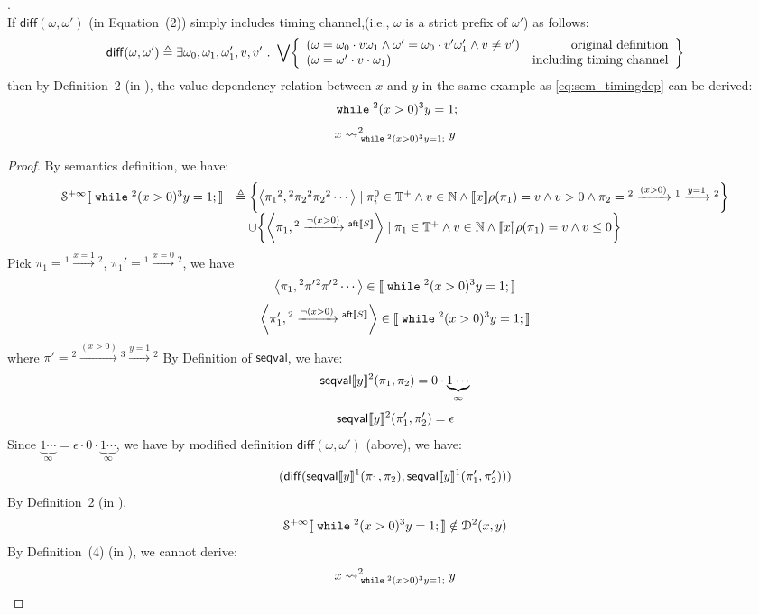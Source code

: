  \begin{example}.
 \label{ex:overapp}
 \\
 If $\mathsf{diff}(\omega, \omega')$ (in \cite{cousot2019abstract} Equation~(2)) simply includes timing channel,(i.e., $\omega$ is a strict prefix of $\omega'$) as follows:
 \[
 	\mathsf{diff}(\omega, \omega') \triangleq \exists \omega_0, \omega_1, \omega_1', v, v' 
 	\st \bigvee \left\{
 	\begin{array}{lr}
 	(\omega = \omega_0 \cdot v \omega_1
 		\land \omega' = \omega_0 \cdot v' \omega_1' \land v \neq v') & \mbox{original definition} \\
 	(\omega = \omega' \cdot v \cdot \omega_1) & \mbox{including timing channel} \\
 	\end{array}
 	\right\}
 \] 
 then by Definition~2 (in \cite{cousot2019abstract}), the value dependency relation between $x$ and $y$ in the same example as \ref{eq:sem_timingdep} can be derived:
 \[
 	\;\mathtt{while}\; {}^2 (x > 0) {}^3 y = 1; 
 \]
  \[
 	x \rightsquigarrow^{2}_{\;\mathtt{while}\; {}^2 (x > 0) {}^3 y = 1;} y
 \]
 \begin{proof}
 By semantics definition, we have:
 \begin{equation}
 \label{eq:sem_timingoverapp}
 \begin{array}{ll}
   \mathcal{S}^{+\infty}\sem{ \ewhile {}^2 (x > 0) {}^3 y = 1; } 
 & \triangleq  
 \left\{ \left< \pi_1{}^2, {}^2 \pi_2 {}^2 \pi_2 {}^2\cdots \right>
 \mid \pi_i^0 \in \mathbb{T^{+}} \land v \in \mathbb{N} \land
 \sem{x}\env(\pi_1) = v
 \land v > 0  \land
 \pi_2 = {}^2 \xrightarrow{(x > 0)} {}^1 \xrightarrow{y = 1} {}^2
 \right\}
 \\ & \quad \cup 
 \left\{ \left< \pi_1, {}^2 \xrightarrow{\neg(x > 0)} {}^{\mathsf{aft}\sem{S}} \right> 
 \mid \pi_1 \in \mathbb{T^{+}} \land v \in \mathbb{N} \land
  \sem{x}\env(\pi_1) = v
 \land v \leq 0 \right\}
 \end{array}
 \end{equation}
 Pick $\pi_1 =  {}^1 \xrightarrow{x = 1} {}^2$, 
 $\pi_1' =  {}^1 \xrightarrow{x = 0} {}^2$, we have
 \[
 	\left< \pi_1, {}^2 \pi' {}^2 \pi' {}^2 \cdots \right> \in \sem{\ewhile {}^2 (x > 0) {}^3 y = 1;}
 \]
 \[
 	\left< \pi_1', {}^2 \xrightarrow{\neg(x > 0)} {}^{\mathsf{aft}\sem{S}}\right> \in \sem{\ewhile {}^2 (x > 0) {}^3 y = 1; }
 \]
 where $\pi' = {}^2 \xrightarrow{(x > 0)} {}^3 \xrightarrow{y = 1} {}^2$
By Definition of $\mathsf{seqval}$, we have:
 \[
  \mathsf{seqval}\llbracket y \rrbracket{}^2(\pi_1, \pi_2 ) = 0 \cdot \underbrace{1 \cdots}_{\infty}
 \]
 \[
  \mathsf{seqval}\llbracket y \rrbracket{}^2(\pi'_1, \pi_2' ) = \epsilon
 \]
 Since $\underbrace{1 \cdots}_{\infty} = \epsilon \cdot 0 \cdot \underbrace{1 \cdots}_{\infty}$,
 we have by modified definition $\mathsf{diff}(\omega, \omega')$ (above), we have:
 \[
  (\mathsf{diff}(\mathsf{seqval}\llbracket y \rrbracket{}^1(\pi_1, \pi_2 ), \mathsf{seqval}\llbracket y \rrbracket{}^1(\pi_1', \pi_2' )))
 \]
  By Definition~2 (in \cite{cousot2019abstract}), 
 \[
  \mathcal{S}^{+\infty}\llbracket \;\mathtt{while}\; {}^2 (x > 0) {}^3 y = 1; \rrbracket 
 \notin \mathcal{D}^2(x, y)
 \]
 By Definition~(4) (in \cite{cousot2019abstract}), we cannot derive:
 \[
  x \rightsquigarrow^{2}_{\;\mathtt{while}\; {}^2 (x > 0) {}^3 y = 1;} y
 \]


\end{proof}
\end{example}
